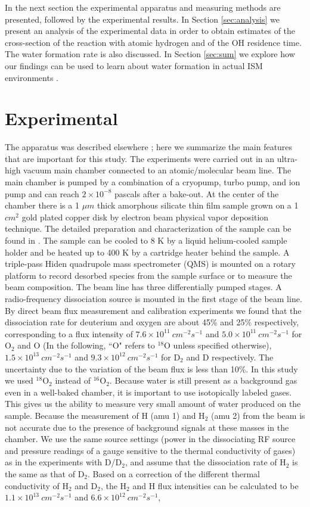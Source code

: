 \documentclass[iop]{emulateapj}
\begin{document}
In the next section the experimental apparatus and measuring methods are presented, followed by the experimental results. In Section \ref{sec:analysis} we present an analysis of the experimental data in order to obtain  estimates of the cross-section of the reaction with atomic hydrogen and of the OH residence time. The water formation rate is also discussed. In Section \ref{sec:sum} we explore how our findings can be used to learn about water formation in actual ISM environments . 


\section{Experimental}
\label{sec:exp}
The apparatus was described elsewhere \citep{He2011,Jing2013}; here we summarize the main features that are important for this study. The experiments were carried out in an ultra-high vacuum main chamber connected to an atomic/molecular beam line. The main chamber is pumped by a combination of a cryopump, turbo pump, and ion pump and can reach $2\times10^{-8}$ pascals after a bake-out. At the center of the chamber there is a 1 $\mu m$ thick amorphous silicate thin film sample grown on a 1 $cm^2$ gold plated copper disk by electron beam physical vapor deposition technique. The detailed preparation and characterization of the sample can be found in \citet{Jing2013}.  The sample can be cooled to 8 K by a liquid helium-cooled sample holder and be heated up to 400 K by a cartridge heater behind the sample. A triple-pass Hiden quadrupole mass spectrometer (QMS) is mounted on a rotary platform to record desorbed species from the sample surface or to measure the beam composition. The beam line has three differentially pumped stages. A radio-frequency dissociation source is mounted in the first stage of the beam line. By direct beam flux measurement and calibration experiments we found that the dissociation rate for deuterium and oxygen are about 45\% and 25\% respectively, corresponding to a flux intensity of $7.6\times 10^{11}\ cm^{-2}s^{-1}$ and $5.0\times 10^{11}\ cm^{-2}s^{-1}$ for O$_2$ and O (In the following, ``O" refers to $^{18}$O unless specified otherwise), $1.5\times10^{13}\ cm^{-2}s^{-1}$ and $9.3\times10^{12}\ cm^{-2}s^{-1}$ for D$_2$ and D respectively. The uncertainty due to the variation of the beam flux is less than 10\%. In this study we used $^{18}$O$_2$ instead of $^{16}$O$_2$. Because water is still present as a background gas even in a well-baked chamber, it is important to use isotopically labeled gases. This gives us the ability to measure very small amount of water produced on the sample. Because the measurement of  H (amu 1) and H$_2$ (amu 2) from the beam is not accurate due to the presence of background signals at these masses in the chamber. We use the same source settings (power in the dissociating RF source and pressure readings of a gauge sensitive to the thermal conductivity of gases) as in the experiments with D/D$_2$, and assume that the dissociation rate of H$_2$ is the same as that of D$_2$. Based on a correction of the different thermal conductivity of H$_2$ and D$_2$, the H$_2$ and H flux intensities can be calculated to be $1.1\times10^{13}\ cm^{-2}s^{-1}$ and $6.6\times10^{12}\ cm^{-2}s^{-1}$, 
\end{document}

